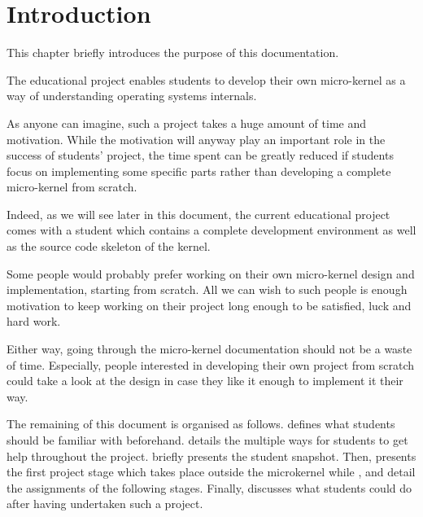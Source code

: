%
%
%
%
%
%

%
%

\chapter{Introduction}
\label{chapter:introduction}

This chapter briefly introduces the purpose of this documentation.

\newpage

%
%

The  educational project enables students to develop their own
micro-kernel as a way of understanding operating systems internals.

As anyone can imagine, such a project takes a huge amount of time and
motivation. While the motivation will anyway play an important role in the
success of students' project, the time spent can be greatly reduced if
students focus on implementing some specific parts rather than developing a
complete micro-kernel from scratch.

Indeed, as we will see later in this document, the current 
educational project comes with a student  which contains
a complete development environment as well as the source code skeleton of
the kernel.

Some people would probably prefer working on their own micro-kernel design
and implementation, starting from scratch. All we can wish to such people
is enough motivation to keep working on their project long enough to be
satisfied, luck and hard work.

Either way, going through the  micro-kernel documentation
should not be a waste of time. Especially, people interested in developing
their own project from scratch could take a look at the  design
in case they like it enough to implement it their way.

The remaining of this document is organised as follows.  defines what students should be familiar with
beforehand.  details the multiple
ways for students to get help throughout the project.  briefly presents the student snapshot. Then,
 presents the first project stage
which takes place outside the microkernel while ,  and  detail the assignments of the following stages. Finally,
 discusses what students could do
after having undertaken such a project.
